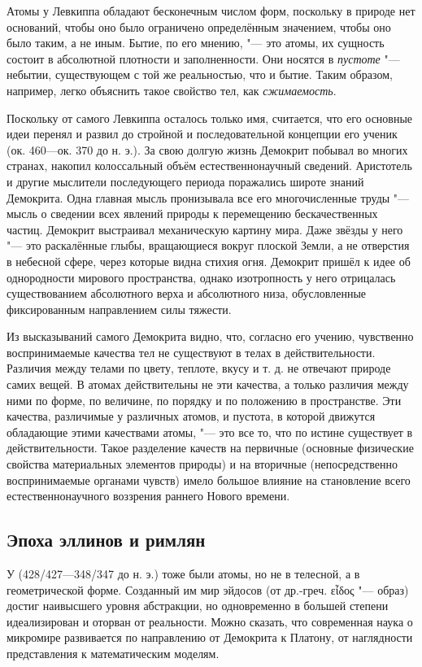 \documentclass[a4paper, 12pt, oneside]{article} %
\begin{document}
Атомы у Левкиппа обладают бесконечным числом форм, поскольку в природе
нет оснований, чтобы оно было ограничено определённым значением, чтобы
оно было таким, а не иным. Бытие, по его мнению, "--- это атомы, их
сущность состоит в абсолютной плотности и заполненности. Они носятся в
\emph{пустоте} "--- небытии, существующем с той же реальностью, что и
бытие. Таким образом, например, легко объяснить такое свойство тел,
как \emph{сжимаемость}.

Поскольку от самого Левкиппа осталось только имя, считается, что его
основные идеи перенял и развил до стройной и последовательной концепции
его ученик  (ок. 460---ок. 370 до н. э.). За свою
долгую жизнь Демокрит побывал во многих странах, накопил колоссальный
объём естественнонаучный сведений. Аристотель и другие мыслители
последующего периода поражались широте знаний Демокрита. Одна главная
мысль пронизывала все его многочисленные труды "--- мысль о сведении всех
явлений природы к перемещению бескачественных частиц. Демокрит
выстраивал механическую картину мира. Даже звёзды у него "--- это
раскалённые глыбы, вращающиеся вокруг плоской Земли, а не отверстия в
небесной сфере, через которые видна стихия огня. Демокрит пришёл к идее
об однородности мирового пространства, однако изотропность у него
отрицалась существованием абсолютного верха и абсолютного низа,
обусловленные фиксированным направлением силы тяжести.

Из высказываний самого Демокрита видно, что, согласно его учению,
чувственно воспринимаемые качества тел не существуют в телах в
действительности. Различия между телами по цвету, теплоте, вкусу и т. д.
не отвечают природе самих вещей. В атомах действительны не эти качества,
а только различия между ними по форме, по величине, по порядку и по
положению в пространстве. Эти качества, различимые у различных атомов, и
пустота, в которой движутся обладающие этими качествами атомы, "--- это
все то, что по истине существует в действительности. Такое разделение
качеств на первичные (основные физические свойства материальных
элементов природы) и на вторичные (непосредственно воспринимаемые
органами чувств) имело большое влияние на становление всего
естественнонаучного воззрения раннего Нового времени.

\subsection{Эпоха эллинов и римлян}

У  (428/427---348/347 до н. э.) тоже были атомы, но не в
телесной, а в геометрической форме. Созданный им мир эйдосов (от
др.-греч. \foreignlanguage{greek}{εἶδος} "--- образ) достиг наивысшего
уровня абстракции, но одновременно в большей степени идеализирован и
оторван от реальности. Можно сказать, что современная наука о микромире
развивается по направлению от Демокрита к Платону, от наглядности
представления к математическим моделям.
\end{document}
